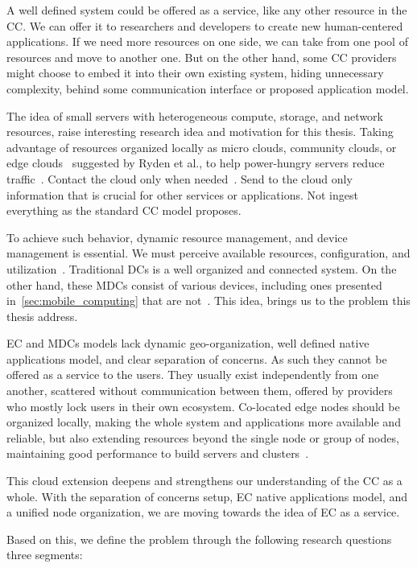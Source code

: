 A well defined system could be offered as a service, like any other resource in the CC. We can offer it to researchers and developers to create new human-centered applications. If we need more resources on one side, we can take from one pool of resources and move to another one.
But on the other hand, some CC providers might choose to embed it into their own existing system, hiding unnecessary complexity, behind some communication interface or proposed application model.

The idea of small servers with heterogeneous compute, storage, and network resources, raise interesting research idea and motivation for this thesis. Taking advantage of resources organized locally as micro clouds, community clouds, or edge clouds~\cite{RydenOCW14} suggested by Ryden et al., to help power-hungry servers reduce traffic~\cite{HirschMZ18}. Contact the cloud only when needed~\cite{inproceedingsSimic1}. Send to the cloud only information that is crucial for other services or applications. Not ingest everything as the standard CC model proposes.

To achieve such behavior, dynamic resource management, and device management is essential. We must perceive available resources, configuration, and utilization~\cite{GubbiBMP13, WangZZWYW17}. Traditional DCs is a well organized and connected system. On the other hand, these MDCs consist of various devices, including ones presented in~\ref{sec:mobile_computing} that are not~\cite{JiangCGZW19}. This idea, brings us to the problem this thesis address.

EC and MDCs models lack dynamic geo-organization, well defined native applications model, and clear separation of concerns. As such they cannot be offered as a service to the users. They usually exist independently from one another, scattered without communication between them, offered by providers who mostly lock users in their own ecosystem. Co-located edge nodes should be organized locally, making the whole system and applications more available and reliable, but also extending resources beyond the single node or group of nodes, maintaining good performance to build servers and clusters~\cite{ArocaG12}.

This cloud extension deepens and strengthens our understanding of the CC as a whole. With the separation of concerns setup, EC native applications model, and a unified node organization, we are moving towards the idea of EC as a service. 

Based on this, we define the problem through the following research questions three segments:

